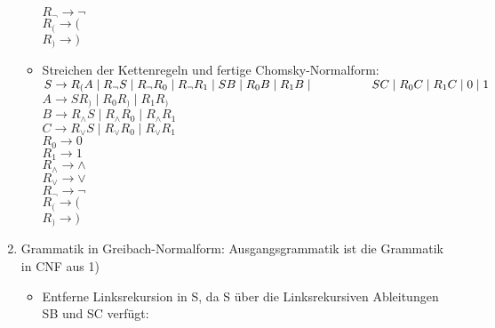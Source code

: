 \documentclass[11pt]{article}
\begin{document}
\begin{enumerate}
\begin{itemize}
\\\hspace*{6mm} $R_{\neg} \rightarrow \neg$
\\\hspace*{6mm} $R_{(} \rightarrow ($
\\\hspace*{6mm} $R_{)} \rightarrow )$
\\\hspace*{6mm}
\item Streichen der Kettenregeln und fertige Chomsky-Normalform:
\\\hspace*{6mm} $S \rightarrow R_{(}A\mid R_{\neg} S \mid R_{\neg} R_{0} \mid R_{\neg} R_{1} \mid S B \mid R_{0}B \mid R_{1}B \mid \hspace*{17mm} SC \mid R_{0} C \mid R_{1}C \mid 0\mid 1$
\\\hspace*{6mm} $A \rightarrow SR_{)} \mid R_{0}R_{)}\mid R_{1}R_{)}$
\\\hspace*{6mm} $B \rightarrow R_{\wedge} S \mid R_{\wedge}R_{0} \mid R_{\wedge}R_{1}$
\\\hspace*{6mm} $C \rightarrow R_{\vee} S \mid R_{\vee}R_{0} \mid R_{\vee}R_{1}$
\\\hspace*{6mm} $R_{0} \rightarrow 0$
\\\hspace*{6mm} $R_{1} \rightarrow 1$
\\\hspace*{6mm} $R_{\wedge} \rightarrow \wedge$
\\\hspace*{6mm} $R_{\vee} \rightarrow \vee$
\\\hspace*{6mm} $R_{\neg} \rightarrow \neg$
\\\hspace*{6mm} $R_{(} \rightarrow ($
\\\hspace*{6mm} $R_{)} \rightarrow )$
\\\hspace*{6mm}
\end{itemize}
\item Grammatik in Greibach-Normalform: Ausgangsgrammatik ist die Grammatik in CNF aus 1)
\begin{itemize}
\item Entferne Linksrekursion in S, da S über die Linksrekursiven Ableitungen SB und SC verfügt:

\end{itemize}
\end{enumerate}
\end{document}
